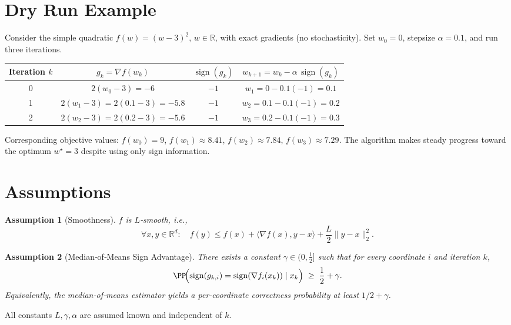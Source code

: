 \documentclass{article}
\newtheorem{assumption}{Assumption}
\newcommand{\sign}{\operatorname{sign}}
\newcommand{\RR}{\mathbb{R}}
\begin{document}
\section*{Dry Run Example}
Consider the simple quadratic $f(w)=(w-3)^{2}$, $w\in\RR$, with exact gradients (no stochasticity).  
Set $w_{0}=0$, stepsize $\alpha=0.1$, and run three iterations.

\begin{center}
\begin{tabular}{c|c|c|c}
Iteration $k$ & $g_{k}=\nabla f(w_{k})$ & $\sign(g_{k})$ & $w_{k+1}=w_{k}-\alpha\,\sign(g_{k})$ \\ \hline
0 & $2(w_{0}-3)=-6$ & $-1$ & $w_{1}=0-0.1(-1)=0.1$ \\[2pt]
1 & $2(w_{1}-3)=2(0.1-3)=-5.8$ & $-1$ & $w_{2}=0.1-0.1(-1)=0.2$ \\[2pt]
2 & $2(w_{2}-3)=2(0.2-3)=-5.6$ & $-1$ & $w_{3}=0.2-0.1(-1)=0.3$
\end{tabular}
\end{center}
Corresponding objective values: $f(w_{0})=9$, $f(w_{1})\approx8.41$, $f(w_{2})\approx7.84$, $f(w_{3})\approx7.29$.
The algorithm makes steady progress toward the optimum $w^{\star}=3$ despite using only sign information.

\newpage
\section*{Assumptions}
\begin{assumption}[Smoothness]\label{ass:smooth}
$f$ is $L$‑smooth, i.e.,
\[
\forall x,y\in\RR^{d}:\quad f(y)\le f(x)+\langle\nabla f(x),y-x\rangle+\frac{L}{2}\|y-x\|_{2}^{2}.
\]
\end{assumption}

\begin{assumption}[Median‑of‑Means Sign Advantage]\label{ass:advantage}
There exists a constant $\gamma\in(0,\tfrac12]$ such that for every coordinate $i$ and iteration $k$,
\[
\PP\!\Bigl(\sign(g_{k,i})=\sign(\nabla f_{i}(x_{k}))\mid x_{k}\Bigr)\;\ge\;\frac12+\gamma .
\]
Equivalently, the median‑of‑means estimator yields a per‑coordinate correctness probability at least $1/2+\gamma$.
\end{assumption}

All constants $L,\gamma,\alpha$ are assumed known and independent of $k$.
\end{document}
